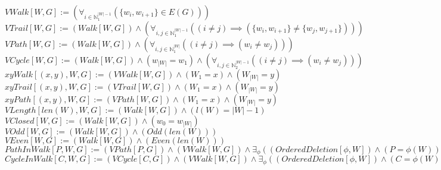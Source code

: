 \documentclass{book}
\newcommand{\abr}{:=}
\newcommand{\utup}[1]{\{#1\}}
\begin{document}
$VWalk[W, G] \abr (\forall_{i \in \mathbb{N}_1^{|W| - 1}}(\utup{w_i, w_{i + 1}} \in E(G)))$ \\
$VTrail[W, G] \abr (Walk[W, G]) \land (\forall_{i, j \in \mathbb{N}_1^{|W| - 1}}((i \neq j) \implies (\utup{w_i, w_{i + 1}} \neq \utup{w_j, w_{j + 1}})))$ \\
$VPath[W, G] \abr (Walk[W, G]) \land (\forall_{i, j \in \mathbb{N}_1^{|W|}}((i \neq j) \implies (w_i \neq w_j)))$ \\
$VCycle[W, G] \abr (Walk[W, G]) \land (w_{|W|} = w_1) \land (\forall_{i, j \in \mathbb{N}_2^{|W| - 1}}((i \neq j) \implies (w_i \neq w_j)))$ \\
$xyWalk[(x, y), W, G] \abr (VWalk[W, G]) \land (W_1 = x) \land (W_{|W|} = y)$ \\
$xyTrail[(x, y), W, G] \abr (VTrail[W, G]) \land (W_1 = x) \land (W_{|W|} = y)$ \\
$xyPath[(x, y), W, G] \abr (VPath[W, G]) \land (W_1 = x) \land (W_{|W|} = y)$ \\
$VLength[len(W), W, G] \abr (Walk[W, G]) \land (l(W) = |W| - 1)$ \\
$VClosed[W, G] \abr (Walk[W, G]) \land (w_0 = w_{|W|})$ \\
$VOdd[W, G] \abr (Walk[W, G]) \land (Odd(len(W)))$ \\
$VEven[W, G] \abr (Walk[W, G]) \land (Even(len(W)))$ \\
$PathInWalk[P, W, G] \abr (VPath[P, G]) \land (VWalk[W, G]) \land \exists_{\phi}((OrderedDeletion[\phi, W]) \land (P = \phi(W)))$ \\
$CycleInWalk[C, W, G] \abr (VCycle[C, G]) \land (VWalk[W, G]) \land \exists_{\phi}((OrderedDeletion[\phi, W]) \land (C = \phi(W)))$ \\
\end{document}
